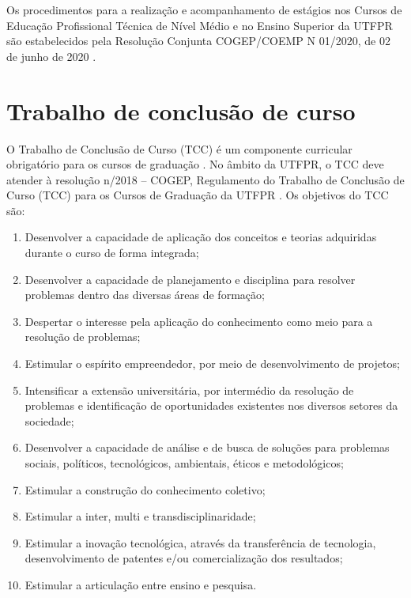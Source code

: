 Os procedimentos para a realização e acompanhamento de estágios nos Cursos de Educação Profissional Técnica de Nível Médio e no Ensino Superior da UTFPR são estabelecidos pela Resolução Conjunta COGEP/COEMP N\textordmasculine{} 01/2020, de 02 de junho de 2020 \cite{cogepcoemp1:2020}.


\section{Trabalho de conclusão de curso}

O Trabalho de Conclusão de Curso (TCC) é um componente curricular obrigatório para os cursos de graduação \cite{dcneng}. No âmbito da UTFPR, o TCC deve atender à resolução n/2018 – COGEP, Regulamento do Trabalho de Conclusão de Curso (TCC) para os Cursos de Graduação da UTFPR \cite{cogep18}. Os objetivos do TCC são:

\begin{enumerate}
	\item Desenvolver a capacidade de aplicação dos conceitos e teorias adquiridas durante o curso de forma integrada;
	\item Desenvolver a capacidade de planejamento e disciplina para resolver problemas dentro das diversas áreas de formação;
	\item Despertar o interesse pela aplicação do conhecimento como meio para a resolução de problemas;
	\item Estimular o espírito empreendedor, por meio de desenvolvimento de projetos;
	\item Intensificar a extensão universitária, por intermédio da resolução de problemas e identificação de oportunidades existentes nos diversos setores da sociedade;
	\item Desenvolver a capacidade de análise e de busca de soluções para problemas sociais, políticos, tecnológicos, ambientais, éticos e metodológicos;
	\item Estimular a construção do conhecimento coletivo; 
	\item Estimular a inter, multi e transdisciplinaridade;
	\item Estimular a inovação tecnológica, através da transferência de tecnologia, desenvolvimento de patentes e/ou comercialização dos resultados;
	\item Estimular a articulação entre ensino e pesquisa.  
		
\end{enumerate}

